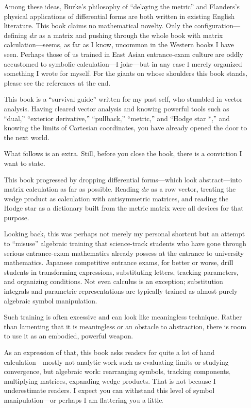 Among these ideas, Burke's philosophy of ``delaying the metric'' and
Flanders's physical applications of differential forms are both written
in existing English literature. This book claims no mathematical
novelty. Only the configuration---defining \(dx\) as a matrix and
pushing through the whole book with matrix calculation---seems, as far
as I know, uncommon in the Western books I have seen. Perhaps those of
us trained in East Asian entrance-exam culture are oddly accustomed to
symbolic calculation---I joke---but in any case I merely organized
something I wrote for myself. For the giants on whose shoulders this
book stands, please see the references at the end.

This book is a ``survival guide'' written for my past self, who stumbled
in vector analysis. Having cleared vector analysis and knowing powerful
tools such as ``dual,'' ``exterior derivative,'' ``pullback,''
``metric,'' and ``Hodge star \(\ast\),'' and knowing the limits of
Cartesian coordinates, you have already opened the door to the next
world.

What follows is an extra. Still, before you close the book, there is a
conviction I want to state.

This book progressed by dropping differential forms---which look
abstract---into matrix calculation as far as possible. Reading \(dx\) as
a row vector, treating the wedge product as calculation with
antisymmetric matrices, and reading the Hodge star as a dictionary built
from the metric matrix were all devices for that purpose.

Looking back, this was perhaps not merely my personal shortcut but an
attempt to ``misuse'' algebraic training that science-track students who
have gone through serious entrance-exam mathematics already possess at
the entrance to university mathematics. Japanese competitive entrance
exams, for better or worse, drill students in transforming expressions,
substituting letters, tracking parameters, and organizing conditions.
Not even calculus is an exception; substitution integrals and parametric
representations are typically trained as almost purely algebraic symbol
manipulation.

Such training is often excessive and can look like meaningless
technique. Rather than lamenting that it is meaningless or an obstacle
to abstraction, there is room to use it as an embodied, powerful weapon.

As an expression of that, this book asks readers for quite a lot of hand
calculation---mostly not analytic work such as evaluating limits or
studying convergence, but algebraic work: rearranging symbols, tracking
components, multiplying matrices, expanding wedge products. That is not
because I underestimate readers. I expect you can withstand this level
of symbol manipulation---or perhaps I am flattering you a little.


